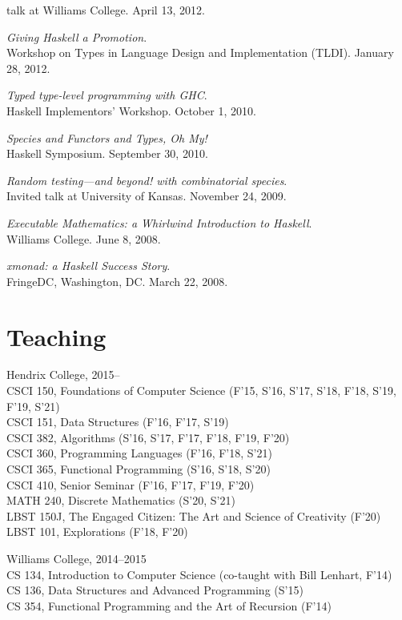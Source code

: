 \documentclass[12pt]{article}
\newcommand{\cvitem}{\par\hangpara{2em}{1}}
\begin{document}
    talk at Williams College. April 13, 2012.
\cvitem \emph{Giving Haskell a Promotion}. \\ Workshop on Types in
    Language Design and Implementation (TLDI). January 28, 2012.
\cvitem \emph{Typed type-level programming with GHC}. \\ Haskell
    Implementors' Workshop. October 1, 2010.
\cvitem \emph{Species and Functors and Types, Oh My!} \\ Haskell
    Symposium. September 30, 2010.
\cvitem \emph{Random testing---and beyond! with combinatorial
    species}. \\ Invited talk at University of Kansas.  November 24, 2009.
\cvitem \emph{Executable Mathematics: a Whirlwind Introduction to
    Haskell}. \\ Williams College.  June 8, 2008.
\cvitem \emph{xmonad: a Haskell Success Story}. \\ FringeDC, Washington,
    DC. March 22, 2008.

\section*{Teaching}

\cvitem
Hendrix College, 2015-- \\
CSCI 150, Foundations of Computer Science (F'15, S'16, S'17, S'18,
F'18, S'19, F'19, S'21) \\
CSCI 151, Data Structures (F'16, F'17, S'19) \\
CSCI 382, Algorithms (S'16, S'17, F'17, F'18, F'19, F'20) \\
CSCI 360, Programming Languages (F'16, F'18, S'21) \\
CSCI 365, Functional Programming (S'16, S'18, S'20) \\
CSCI 410, Senior Seminar (F'16, F'17, F'19, F'20) \\
MATH 240, Discrete Mathematics (S'20, S'21) \\
LBST 150J, The Engaged Citizen: The Art and Science of Creativity
(F'20) \\
LBST 101, Explorations (F'18, F'20)

\cvitem
Williams College, 2014--2015 \\
CS 134, Introduction to Computer Science (co-taught with Bill Lenhart,
F'14) \\
CS 136, Data Structures and Advanced Programming (S'15) \\
CS 354, Functional Programming and the Art of Recursion (F'14)
\end{document}
